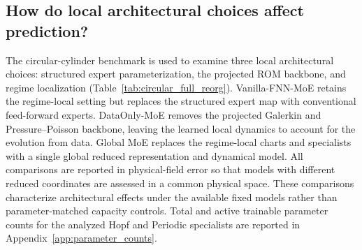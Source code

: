\documentclass{article}
\begin{document}
\subsection{How do local architectural choices affect prediction?}

The circular-cylinder benchmark is used to examine three local architectural choices: structured expert parameterization, the projected ROM backbone, and regime localization (Table~\ref{tab:circular_full_reorg}). Vanilla-FNN-MoE retains the regime-local setting but replaces the structured expert map with conventional feed-forward experts. DataOnly-MoE removes the projected Galerkin and Pressure--Poisson backbone, leaving the learned local dynamics to account for the evolution from data. Global MoE replaces the regime-local charts and specialists with a single global reduced representation and dynamical model. All comparisons are reported in physical-field error so that models with different reduced coordinates are assessed in a common physical space. These comparisons characterize architectural effects under the available fixed models rather than parameter-matched capacity controls. Total and active trainable parameter counts for the analyzed Hopf and Periodic specialists are reported in Appendix~\ref{app:parameter_counts}.
\end{document}
